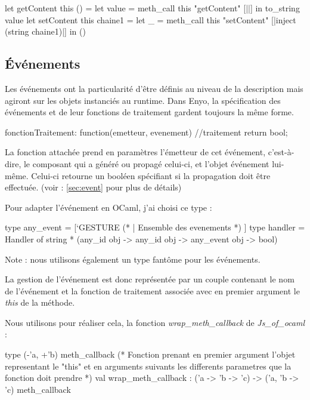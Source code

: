 \documentclass[11pt,a4paper]{report}
\begin{document}
\begin{OCaml}
  let getContent this () =
	let value = meth_call this "getContent" [||] in
		to_string value
  let setContent this chaine1 =
	let _ = meth_call this "setContent" [|inject (string chaine1)|] in
		()
\end{OCaml}

\subsection{\'Evénements}

Les événements ont la particularité d'être définis au niveau de la description mais agiront sur les objets
instanciés au runtime. Dans Enyo, la spécification des événements et de leur fonctions 
de traitement gardent toujours la même forme.

\begin{JavaScript}
  fonctionTraitement: function(emetteur, evenement){
                          //traitement
                          return bool; }
\end{JavaScript}

La fonction attachée prend en paramètres l'émetteur de cet événement, c'est-à-dire, 
le composant qui a généré ou propagé celui-ci, et l'objet événement lui-même.
Celui-ci retourne un booléen spécifiant si la propagation doit être effectuée.
(voir : \ref{sec:event} pour plus de détails)

Pour adapter l'événement en OCaml, j'ai choisi ce type :
\begin{OCaml}
  type any_event = [`GESTURE (* |  Ensemble des evenements *) ]
  type handler = Handler of string * (any_id obj -> any_id obj -> any_event obj -> bool)
\end{OCaml}

Note : nous utilisons également un type fantôme pour les événements.

La gestion de l'événement est donc représentée par un couple contenant le nom de l'événement et la 
fonction de traitement associée avec en premier argument le \emph{this} de la méthode.

Nous utilisons pour réaliser cela, la fonction \emph{wrap\_meth\_callback} de \emph{Js\_of\_ocaml} :
\begin{OCaml}
type (-'a, +'b) meth_callback
(* Fonction prenant en premier argument l'objet representant le "this"
   et en arguments suivants les differents parametres que la
   fonction doit prendre *)
val wrap_meth_callback : ('a -> 'b -> 'c) -> ('a, 'b -> 'c) meth_callback
\end{OCaml}
\end{document}

